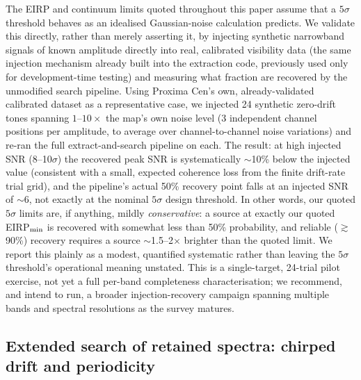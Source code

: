 \documentclass{openjournal}
\begin{document}
The EIRP and continuum limits quoted throughout this paper assume that a
$5\sigma$ threshold behaves as an idealised Gaussian-noise calculation
predicts. We validate this directly, rather than merely asserting it, by
injecting synthetic narrowband signals of known amplitude directly into
real, calibrated visibility data (the same injection mechanism already
built into the extraction code, previously used only for
development-time testing) and measuring what fraction are recovered by
the unmodified search pipeline. Using Proxima Cen's own, already-validated
calibrated dataset as a representative case, we injected 24 synthetic
zero-drift tones spanning $1$--$10\times$ the map's own noise level (3
independent channel positions per amplitude, to average over
channel-to-channel noise variations) and re-ran the full extract-and-search
pipeline on each. The result: at high injected SNR (8--10$\sigma$) the
recovered peak SNR is systematically $\sim$10\% below the injected value
(consistent with a small, expected coherence loss from the finite
drift-rate trial grid), and the pipeline's actual 50\% recovery point
falls at an injected SNR of $\sim$6, not exactly at the nominal
$5\sigma$ design threshold. In other words, our quoted $5\sigma$ limits
are, if anything, mildly \emph{conservative}: a source at exactly our
quoted EIRP$_{\rm min}$ is recovered with somewhat less than 50\%
probability, and reliable ($\gtrsim$90\%) recovery requires a source
$\sim$1.5--2$\times$ brighter than the quoted limit. We report this
plainly as a modest, quantified systematic rather than leaving the
$5\sigma$ threshold's operational meaning unstated. This is a single-target,
24-trial pilot exercise, not yet a full per-band completeness
characterisation; we recommend, and intend to run, a broader
injection-recovery campaign spanning multiple bands and spectral
resolutions as the survey matures.

\subsection{Extended search of retained spectra: chirped drift and
periodicity}
\label{sec:extended}
\end{document}
